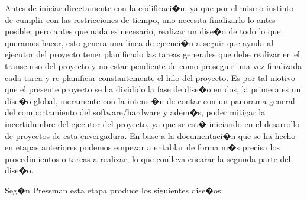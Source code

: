 Antes de iniciar directamente con la codificaci�n, ya que por el mismo instinto de cumplir con las restricciones de tiempo, uno necesita finalizarlo lo antes posible; pero antes que nada es necesario, realizar un dise�o de todo lo que queramos hacer, esto genera una linea de ejecuci�n a seguir que ayuda al ejecutor del proyecto tener planificado las tareas generales que debe realizar en el transcurso del proyecto y no estar pendiente de como proseguir una vez finalizada cada tarea y re-planificar constantemente el hilo del proyecto. Es por tal motivo que el presente proyecto se ha dividido la fase de dise�o en dos, la primera es un dise�o global, meramente con la intensi�n de contar con un panorama general del comportamiento del software/hardware y adem�s, poder mitigar la incertidumbre del ejecutor del proyecto, ya que se est� iniciando en el desarrollo de proyectos de esta envergadura. En base a la documentaci�n que se ha hecho en etapas anteriores podemos empezar a entablar de forma m�s precisa los procedimientos o tareas a realizar, lo que conlleva encarar la segunda parte del dise�o.


\par Seg�n Pressman esta etapa produce los siguientes dise�os:

